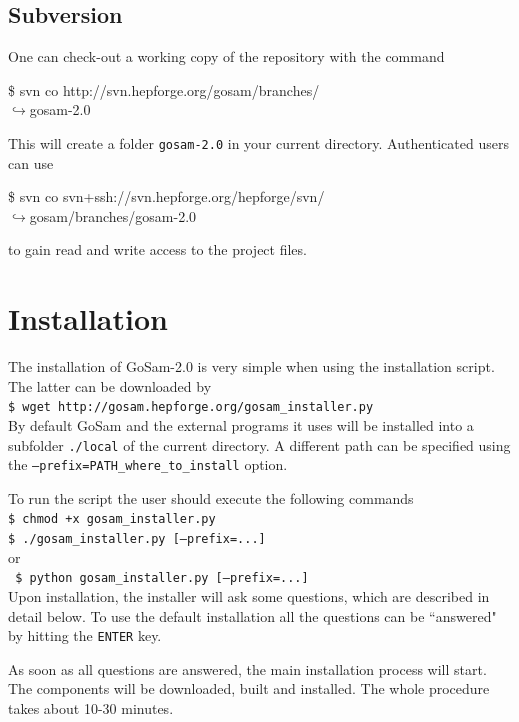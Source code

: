 \documentclass[11pt,a4paper]{refrep}
\newcommand{\gosamversion}{{2{.}0}}
\newcommand{\gosam}{{\sc GoSam}\xspace}
\newcommand{\contl}{{\ensuremath{\hookrightarrow}}}
\newcommand{\bcen}{\begin{center}}
\newcommand{\ecen}{\end{center}}
\begin{document}
\subsection*{Subversion}
One can check-out a working copy of the repository with the command
\begin{example}
\$ svn co http://svn.hepforge.org/gosam/branches/\\
   \contl{}gosam-\gosamversion{}
\end{example}
This will create a folder \texttt{gosam-\gosamversion} in your current directory.
Authenticated users can use 
\begin{example}
\$ svn co svn+ssh://svn.hepforge.org/hepforge/svn/\\
   \contl{}gosam/branches/gosam-\gosamversion{}
\end{example}
to gain read and write access to the project files.

\section{Installation}

The installation of \gosam-\gosamversion{} is very simple when using the installation script.
The latter can be downloaded by\\
{\tt \$  wget  http://gosam.hepforge.org/gosam\_installer.py}\\
By default \gosam{} and the external programs it uses  will be 
installed into a subfolder {\tt ./local}
of the current directory. A different path can be specified 
using the {\tt --prefix=PATH\_where\_to\_install} option.

\noindent To run the script the user should execute the following commands\\
{\tt \$  chmod +x gosam\_installer.py\\
     \$  ./gosam\_installer.py     [--prefix=...]
}\\ 
 or\\
{\tt           
\$ python gosam\_installer.py   [--prefix=...]
}\\
Upon installation, the installer will ask some questions, which are described in 
detail below. To use the default installation all the questions can 
be ``answered" by hitting the {\tt ENTER} key.

As soon as all questions are answered, the main installation process will start. 
The components will be downloaded, built and installed. 
The whole procedure takes about 10-30 minutes.
\end{document}
